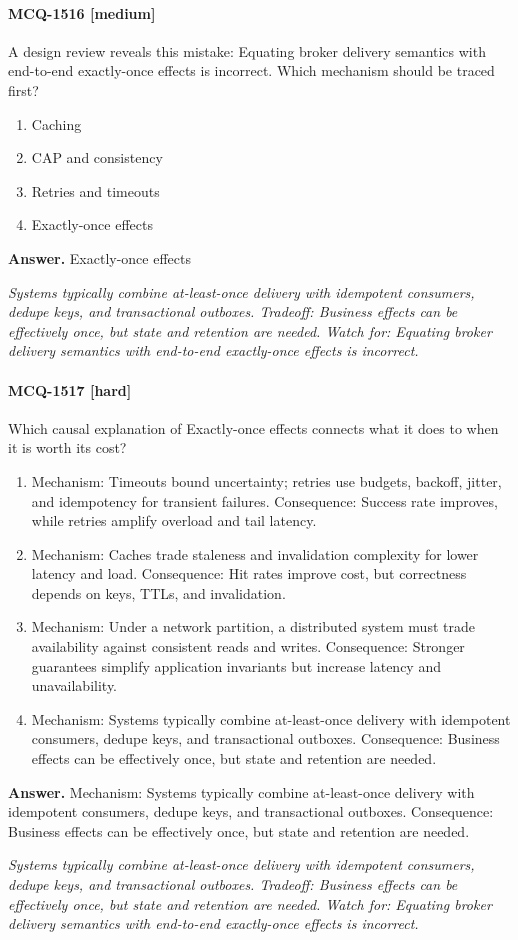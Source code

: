 \paragraph{MCQ-1516 [medium]} A design review reveals this mistake: Equating broker delivery semantics with end-to-end exactly-once effects is incorrect. Which mechanism should be traced first?
\begin{enumerate}[label=\Alph*.]
\item Caching
\item CAP and consistency
\item Retries and timeouts
\item Exactly-once effects
\end{enumerate}
\noindent\textbf{Answer.} Exactly-once effects
\par\textit{Systems typically combine at-least-once delivery with idempotent consumers, dedupe keys, and transactional outboxes. Tradeoff: Business effects can be effectively once, but state and retention are needed. Watch for: Equating broker delivery semantics with end-to-end exactly-once effects is incorrect.}
\paragraph{MCQ-1517 [hard]} Which causal explanation of Exactly-once effects connects what it does to when it is worth its cost?
\begin{enumerate}[label=\Alph*.]
\item Mechanism: Timeouts bound uncertainty; retries use budgets, backoff, jitter, and idempotency for transient failures. Consequence: Success rate improves, while retries amplify overload and tail latency.
\item Mechanism: Caches trade staleness and invalidation complexity for lower latency and load. Consequence: Hit rates improve cost, but correctness depends on keys, TTLs, and invalidation.
\item Mechanism: Under a network partition, a distributed system must trade availability against consistent reads and writes. Consequence: Stronger guarantees simplify application invariants but increase latency and unavailability.
\item Mechanism: Systems typically combine at-least-once delivery with idempotent consumers, dedupe keys, and transactional outboxes. Consequence: Business effects can be effectively once, but state and retention are needed.
\end{enumerate}
\noindent\textbf{Answer.} Mechanism: Systems typically combine at-least-once delivery with idempotent consumers, dedupe keys, and transactional outboxes. Consequence: Business effects can be effectively once, but state and retention are needed.
\par\textit{Systems typically combine at-least-once delivery with idempotent consumers, dedupe keys, and transactional outboxes. Tradeoff: Business effects can be effectively once, but state and retention are needed. Watch for: Equating broker delivery semantics with end-to-end exactly-once effects is incorrect.}
